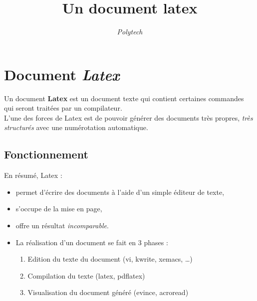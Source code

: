 \title{Un document latex}
\author{\textit{Polytech}}
\date{}


\maketitle

\section{Document \textit{Latex}}

Un document \textbf{Latex} est un document texte qui contient certaines
commandes qui seront traitées par un compilateur. \\
L'une des forces de Latex est de pouvoir générer des documents très
propres, \textit{très structurés} avec une numérotation automatique.

\subsection{Fonctionnement}

En résumé, Latex :

\begin{itemize}
\item permet d'écrire des documents à l'aide d'un simple éditeur de texte,
\item s'occupe de la mise en page,
\item offre un résultat \textit{incomparable}. 
\item La réalisation d'un document se fait en 3 phases :
    \begin{enumerate}
    \item Edition du texte du document (vi, kwrite, xemacs, \ldots)
    \item Compilation du texte (latex, pdflatex)
    \item Visualisation du document généré (evince, acroread)
    \end{enumerate}
\end{itemize}


